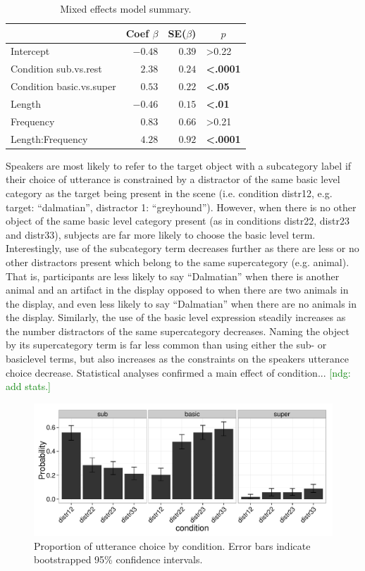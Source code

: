 \documentclass[10pt,letterpaper]{article}
\newcommand{\ndg}[1]{\textcolor{Green}{[ndg: #1]}}
\begin{document}
\begin{table}[!tbp]
\caption{Mixed effects model summary.}
\begin{center}
\begin{tabular}{lrrl}
\toprule
\multicolumn{1}{l}{}&\multicolumn{1}{c}{Coef $\beta$}&\multicolumn{1}{c}{SE($\beta$)}&\multicolumn{1}{c}{$p$}\tabularnewline
\midrule
Intercept&$-0.48$&$0.39$&\textgreater0.22\tabularnewline
Condition sub.vs.rest&$ 2.38$&$0.24$&\textbf{\textless.0001}\tabularnewline
Condition basic.vs.super&$ 0.53$&$0.22$&\textbf{\textless.05}\tabularnewline
Length&$-0.46$&$0.15$&\textbf{\textless.01}\tabularnewline
Frequency&$ 0.83$&$0.66$&\textgreater0.21\tabularnewline
Length:Frequency&$ 4.28$&$0.92$&\textbf{\textless.0001}\tabularnewline
\bottomrule
\end{tabular}\end{center}
\label{tab:modelresults}
\end{table}

Speakers are most  likely to refer to the target object with a subcategory label if their choice of utterance is constrained by a distractor of the same basic level category as the target being present in the scene (i.e. condition distr12, e.g. target: ``dalmatian'', distractor 1: ``greyhound''). However, when there is no other object of the same basic level category present (as in conditions distr22, distr23 and distr33), subjects are far more likely to choose the basic level term. Interestingly, use of the subcategory term decreases further as there are less or no other distractors present which belong to the same supercategory (e.g. animal). That is, participants are less likely to say ``Dalmatian'' when there is another animal and an artifact in the display opposed to when there are two animals in the display, and even less likely to say ``Dalmatian'' when there are no animals in the display. Similarly, the use of the basic level expression steadily increases as the number distractors of the same supercategory decreases. Naming the object by its supercategory term is far less common than using either the sub- or basiclevel terms, but also increases as the constraints on the speakers utterance choice decrease. Statistical analyses confirmed a main effect of condition...
\ndg{add stats.}

\begin{figure}[ht!]
\centering
\includegraphics[width=.5\textwidth]{graphs/proportion_mentioned_features}
\caption{Proportion of utterance choice by condition. Error bars indicate bootstrapped 95\% confidence intervals.}
\label{fig:results1}
\end{figure}
\end{document}
